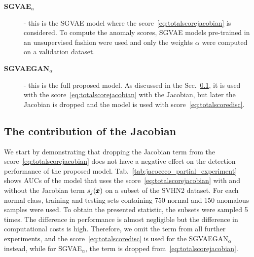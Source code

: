 \begin{description}
    \item[\textbf{SGVAE$_{\alpha}$}] - this is the SGVAE model where the score~\eqref{eq:totalscorejacobian} is considered. To compute the anomaly scores,  SGVAE models pre-trained in an unsupervised fashion were used and only the weights $\alpha$ were computed on a validation dataset.
    \item[\textbf{SGVAEGAN$_{\alpha}$}] - this is the full proposed model. As discussed in the Sec.~\ref{sec:jacobian_contribution}, it is used with the score~\eqref{eq:totalscorejacobian} with the Jacobian, but later the Jacobian is dropped and the model is used with score~\eqref{eq:totalscoredisc}.
\end{description}
    
\subsection{The contribution of the Jacobian} \label{sec:jacobian_contribution}

We start by demonstrating that dropping the Jacobian term from the score~\eqref{eq:totalscorejacobian} does not have a negative effect on the detection performance of the proposed model. Tab.~\ref{tab:jacoceco_partial_experiment} shows AUCs of the model that uses the score~\eqref{eq:totalscorejacobian} with and without the Jacobian term $s_j(\pmb{{x}})$ on a subset of the SVHN2 dataset. For each normal class, training and testing sets containing 750 normal and 150 anomalous samples were used. To obtain the presented statistic, the subsets were sampled 5 times.  The difference in performance is almost negligible but the difference in computational costs is high. Therefore, we omit the term from all further experiments, and the score~\eqref{eq:totalscoredisc} is used for the SGVAEGAN$_{\alpha}$ instead, while for SGVAE$_\alpha$, the term is dropped from~\eqref{eq:totalscorejacobian}.

